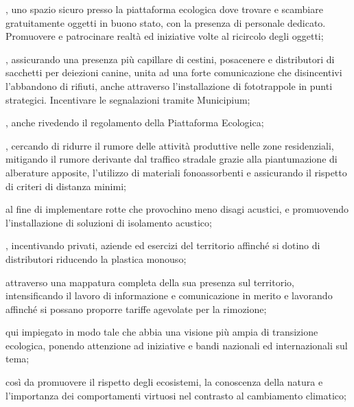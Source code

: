 , uno spazio sicuro presso la piattaforma ecologica dove trovare e scambiare gratuitamente oggetti in buono stato, con la presenza di personale dedicato. Promuovere e patrocinare realtà ed iniziative volte al ricircolo degli oggetti;

, assicurando una presenza più capillare di cestini, posacenere e distributori di sacchetti per deiezioni canine, unita ad una forte comunicazione che disincentivi l'abbandono di rifiuti, anche attraverso l'installazione di fototrappole in punti strategici. Incentivare le segnalazioni tramite Municipium;

, anche rivedendo il regolamento della Piattaforma Ecologica; 

, cercando di ridurre il rumore delle attività produttive nelle zone residenziali, mitigando il rumore derivante dal traffico stradale grazie alla  piantumazione di alberature apposite, l'utilizzo di materiali fonoassorbenti e assicurando il rispetto di criteri di distanza minimi;

 al fine di implementare rotte che provochino meno disagi acustici, e promuovendo l'installazione di soluzioni di isolamento acustico;

, incentivando privati, aziende ed esercizi del territorio affinché si dotino di distributori riducendo la plastica monouso; 

 attraverso una mappatura completa della sua presenza sul territorio, intensificando il lavoro di informazione e comunicazione in merito e lavorando affinché si possano proporre tariffe agevolate per la rimozione; 

 qui impiegato in modo tale che abbia una visione più ampia di transizione ecologica, ponendo attenzione ad iniziative e bandi nazionali ed internazionali sul tema; 

 così da promuovere il rispetto degli ecosistemi, la conoscenza della natura e l'importanza dei comportamenti virtuosi nel contrasto al cambiamento climatico; 

